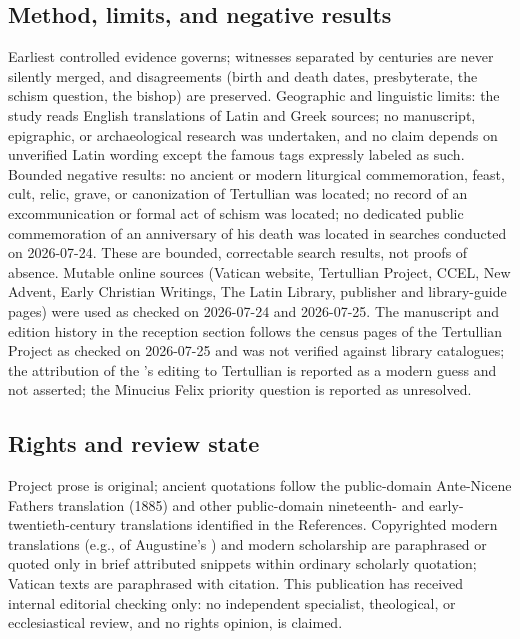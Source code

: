 \subsection{Method, limits, and negative results}

Earliest controlled evidence governs; witnesses separated by centuries are
never silently merged, and disagreements (birth and death dates, presbyterate,
the schism question, the  bishop) are preserved. Geographic
and linguistic limits: the study reads English translations of Latin and Greek
sources; no manuscript, epigraphic, or archaeological research was undertaken,
and no claim depends on unverified Latin wording except the famous tags
expressly labeled as such. Bounded negative results: no ancient or modern
liturgical commemoration, feast, cult, relic, grave, or canonization of
Tertullian was located; no record of an excommunication or formal act of
schism was located; no dedicated public commemoration of an anniversary of his
death was located in searches conducted on 2026-07-24. These are bounded,
correctable search results, not proofs of absence. Mutable online sources
(Vatican website, Tertullian Project, CCEL, New Advent, Early Christian
Writings, The Latin Library, publisher and library-guide pages) were used as
checked on 2026-07-24 and 2026-07-25. The manuscript and edition history in
the reception section follows the census pages of the Tertullian Project as
checked on 2026-07-25 and was not verified against library catalogues; the
attribution of the 's editing to Tertullian is
reported as a modern guess and not asserted; the Minucius Felix priority
question is reported as unresolved.

\subsection{Rights and review state}

Project prose is original; ancient quotations follow the public-domain
Ante-Nicene Fathers translation (1885) and other public-domain nineteenth- and
early-twentieth-century translations identified in the References. Copyrighted
modern translations (e.g., of Augustine's ) and modern
scholarship are paraphrased or quoted only in brief attributed snippets within
ordinary scholarly quotation; Vatican texts are paraphrased with citation.
This publication has received internal editorial checking only: no independent
specialist, theological, or ecclesiastical review, and no rights opinion, is
claimed.
